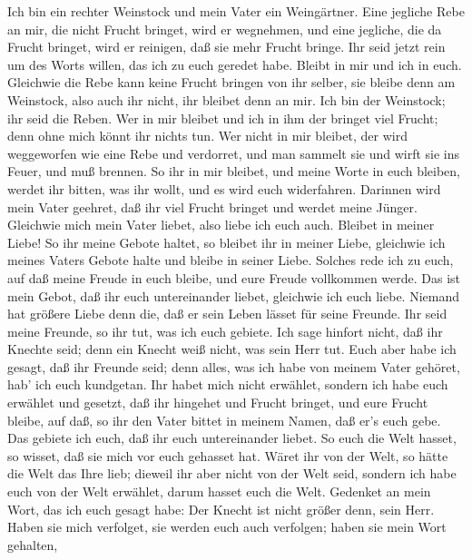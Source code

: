  Ich bin ein rechter Weinstock und mein Vater ein
Weingärtner.  Eine jegliche Rebe an mir, die nicht Frucht
bringet, wird er wegnehmen, und eine jegliche, die da Frucht bringet,
wird er reinigen, daß sie mehr Frucht bringe.  Ihr seid
jetzt rein um des Worts willen, das ich zu euch geredet habe.
 Bleibt in mir und ich in euch. Gleichwie die Rebe kann
keine Frucht bringen von ihr selber, sie bleibe denn am Weinstock, also
auch ihr nicht, ihr bleibet denn an mir.  Ich bin der
Weinstock; ihr seid die Reben. Wer in mir bleibet und ich in ihm der
bringet viel Frucht; denn ohne mich könnt ihr nichts tun. 
Wer nicht in mir bleibet, der wird weggeworfen wie eine Rebe und
verdorret, und man sammelt sie und wirft sie ins Feuer, und muß brennen.
 So ihr in mir bleibet, und meine Worte in euch bleiben,
werdet ihr bitten, was ihr wollt, und es wird euch widerfahren.
 Darinnen wird mein Vater geehret, daß ihr viel Frucht
bringet und werdet meine Jünger.  Gleichwie mich mein Vater
liebet, also liebe ich euch auch. Bleibet in meiner Liebe! 
So ihr meine Gebote haltet, so bleibet ihr in meiner Liebe, gleichwie
ich meines Vaters Gebote halte und bleibe in seiner Liebe. 
Solches rede ich zu euch, auf daß meine Freude in euch bleibe, und eure
Freude vollkommen werde.  Das ist mein Gebot, daß ihr euch
untereinander liebet, gleichwie ich euch liebe.  Niemand
hat größere Liebe denn die, daß er sein Leben lässet für seine Freunde.
 Ihr seid meine Freunde, so ihr tut, was ich euch gebiete.
 Ich sage hinfort nicht, daß ihr Knechte seid; denn ein
Knecht weiß nicht, was sein Herr tut. Euch aber habe ich gesagt, daß ihr
Freunde seid; denn alles, was ich habe von meinem Vater gehöret, hab'
ich euch kundgetan.  Ihr habet mich nicht erwählet, sondern
ich habe euch erwählet und gesetzt, daß ihr hingehet und Frucht bringet,
und eure Frucht bleibe, auf daß, so ihr den Vater bittet in meinem
Namen, daß er's euch gebe.  Das gebiete ich euch, daß ihr
euch untereinander liebet.  So euch die Welt hasset, so
wisset, daß sie mich vor euch gehasset hat.  Wäret ihr von
der Welt, so hätte die Welt das Ihre lieb; dieweil ihr aber nicht von
der Welt seid, sondern ich habe euch von der Welt erwählet, darum hasset
euch die Welt.  Gedenket an mein Wort, das ich euch gesagt
habe: Der Knecht ist nicht größer denn, sein Herr. Haben sie mich
verfolget, sie werden euch auch verfolgen; haben sie mein Wort gehalten,
